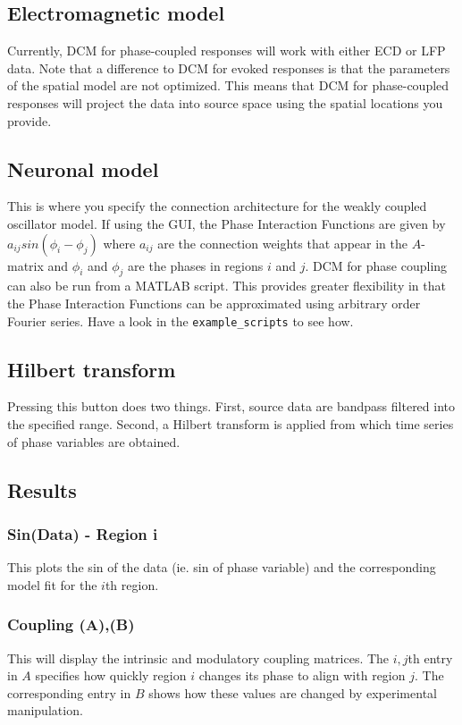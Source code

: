 \subsection{Electromagnetic model}
Currently, DCM for phase-coupled responses will work with either ECD or LFP data.  Note that a difference to DCM for evoked responses is that the parameters of the spatial model are not optimized. This means that DCM for phase-coupled responses will project the data into source space using the spatial locations you provide.

\subsection{Neuronal model}
This is where you specify the connection architecture for the weakly coupled oscillator model. If using the GUI, the Phase Interaction Functions are given by $a_{ij} sin (\phi_i-\phi_j)$ where $a_{ij}$ are the connection weights that appear in the $A$-matrix and $\phi_i$ and $\phi_j$ are the phases in regions $i$ and $j$. DCM for phase coupling can also be run from a MATLAB script. This provides greater flexibility in that the Phase Interaction Functions can be approximated using arbitrary order Fourier series. Have a look in the \texttt{example\_scripts} to see how.

\subsection{Hilbert transform}
Pressing this button does two things. First, source data are bandpass filtered into the specified range. Second, a Hilbert transform is applied from which time series of phase variables are obtained. 

\subsection{Results}

\subsubsection{Sin(Data) - Region i}
This plots the sin of the data (ie. sin of phase variable) and the corresponding model fit for the $i$th region.

\subsubsection{Coupling (A),(B)}
This will display the intrinsic and modulatory coupling matrices. The $i,j$th entry in $A$ specifies how quickly region $i$ changes its phase to align with region $j$. The corresponding entry in $B$ shows how these values are changed by experimental manipulation. 
